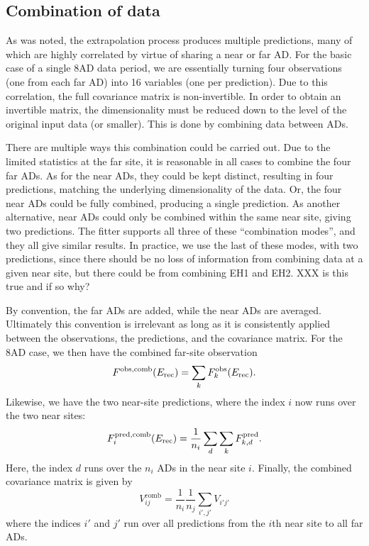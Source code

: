 \documentclass[../thesis.tex]{subfiles}
\begin{document}
\subsection{Combination of data}
\label{sec:fitCombo}

As was noted, the extrapolation process produces multiple predictions, many of which are highly correlated by virtue of sharing a near or far AD. For the basic case of a single 8AD data period, we are essentially turning four observations (one from each far AD) into 16 variables (one per prediction). Due to this correlation, the full covariance matrix is non-invertible. In order to obtain an invertible matrix, the dimensionality must be reduced down to the level of the original input data (or smaller). This is done by combining data between ADs.

There are multiple ways this combination could be carried out. Due to the limited statistics at the far site, it is reasonable in all cases to combine the four far ADs. As for the near ADs, they could be kept distinct, resulting in four predictions, matching the underlying dimensionality of the data. Or, the four near ADs could be fully combined, producing a single prediction. As another alternative, near ADs could only be combined within the same near site, giving two predictions. The fitter supports all three of these ``combination modes'', and they all give similar results. In practice, we use the last of these modes, with two predictions, since there should be no loss of information from combining data at a given near site, but there could be from combining EH1 and EH2. XXX is this true and if so why?

By convention, the far ADs are added, while the near ADs are averaged. Ultimately this convention is irrelevant as long as it is consistently applied between the observations, the predictions, and the covariance matrix. For the 8AD case, we then have the combined far-site observation
\begin{equation*}
  F^{\mathrm{obs},\mathrm{comb}}(E_\mathrm{rec}) = \sum_k F^{\mathrm{obs}}_k(E_\mathrm{rec}).
\end{equation*}
Likewise, we have the two near-site predictions, where the index $i$ now runs over the two near sites:
\begin{equation*}
  F^{\mathrm{pred},\mathrm{comb}}_i (E_\mathrm{rec}) = \frac{1}{n_i} \sum_d \sum_k F^{\mathrm{pred}}_{k,d}.
\end{equation*}
Here, the index $d$ runs over the $n_i$ ADs in the near site $i$. Finally, the combined covariance matrix is given by
\begin{equation*}
  V^{\mathrm{comb}}_{ij} = \frac{1}{n_i} \frac{1}{n_j} \sum_{i',j'} V_{i'j'}
\end{equation*}
where the indices $i'$ and $j'$ run over all predictions from the $i$th near site to all far ADs.
\end{document}
